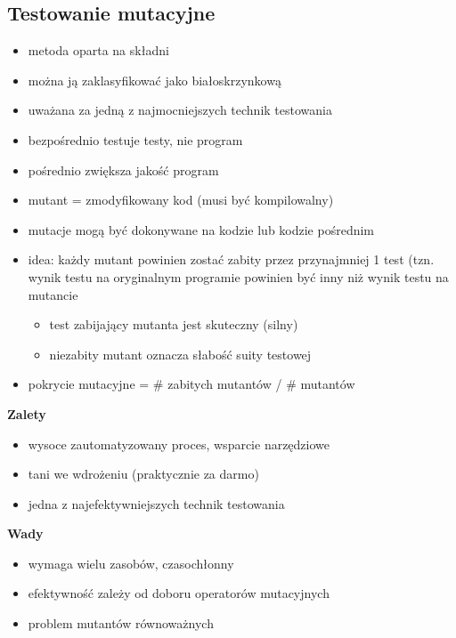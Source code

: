 \documentclass[../main.tex]{subfiles}
\begin{document}
    \subsection{Testowanie mutacyjne}
    \begin{itemize}
        \item metoda oparta na składni
        \item można ją zaklasyfikować jako białoskrzynkową
        \item uważana za jedną z najmocniejszych technik testowania
        \item bezpośrednio testuje testy, nie program
        \item pośrednio zwiększa jakość program
        \item mutant = zmodyfikowany kod (musi być kompilowalny)
        \item mutacje mogą być dokonywane na kodzie lub kodzie pośrednim
        \item idea: każdy mutant powinien zostać zabity przez
        przynajmniej 1 test (tzn. wynik testu na oryginalnym
        programie powinien być inny niż wynik testu na mutancie
        \begin{itemize}
            \item test zabijający mutanta jest skuteczny (silny)
            \item niezabity mutant oznacza słabość suity testowej
        \end{itemize}
        \item pokrycie mutacyjne = \# zabitych mutantów / \# mutantów
    \end{itemize}

    \textbf{Zalety}
    \begin{itemize}
        \item wysoce zautomatyzowany proces, wsparcie narzędziowe
        \item tani we wdrożeniu (praktycznie za darmo)
        \item jedna z najefektywniejszych technik testowania
    \end{itemize}


    \textbf{Wady}
    \begin{itemize}
        \item wymaga wielu zasobów, czasochłonny
        \item efektywność zależy od doboru operatorów mutacyjnych
        \item problem mutantów równoważnych
    \end{itemize}
\end{document}
